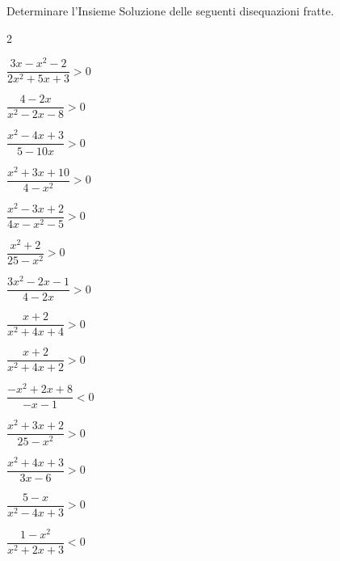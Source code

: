 \begin{esercizio}[*]
\label{ese:4.61}
Determinare l'Insieme Soluzione delle seguenti disequazioni fratte.
\begin{htmulticols}{2}
\begin{enumeratea}
\item \(\dfrac{3x-x^2-2}{2x^2+5x+3}>0\) 
\item \(\dfrac{4-2x}{x^2-2x-8}>0\) 
\item \(\dfrac{x^2-4x+3}{5-10x}>0\) 
\item \(\dfrac{x^2+3x+10}{4-x^2}>0\) 
\item \(\dfrac{x^2-3x+2}{4x-x^2-5}>0\) 
\item \(\dfrac{x^2+2}{25-x^2}>0\) 
\item \(\dfrac{3x^2-2x-1}{4-2x}>0\) 
\item \(\dfrac{x+2}{x^2+4x+4}>0\) 
\item \(\dfrac{x+2}{x^2+4x+2}>0\) 
\item \(\dfrac{-x^2+2x+8}{-x-1}<0\) 
\item \(\dfrac{x^2+3x+2}{25-x^2}>0\) 
\item \(\dfrac{x^2+4x+3}{3x-6}>0\) 
\item \(\dfrac{5-x}{x^2-4x+3}>0\) 
\item \(\dfrac{1-x^2}{x^2+2x+3}<0\) 
\end{enumeratea}
\end{htmulticols}
\end{esercizio}


